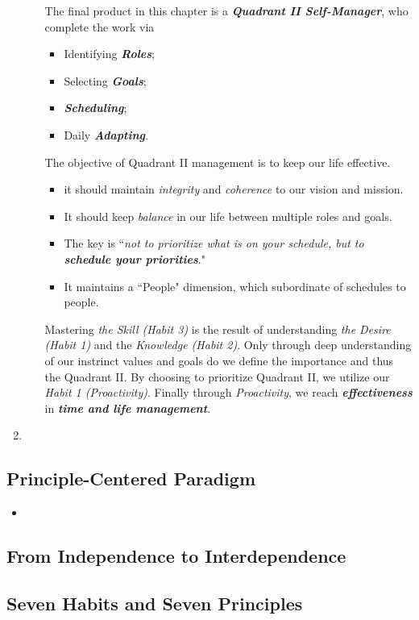 \documentclass[11pt]{article}
\begin{document}
\begin{enumerate}
\begin{enumerate}
The final product in this chapter is a \emph{\textbf{Quadrant II Self-Manager}}, who complete the work via
\begin{itemize}
\item Identifying \emph{\textbf{Roles}};
\item Selecting \emph{\textbf{Goals}};
\item \emph{\textbf{Scheduling}};
\item Daily \emph{\textbf{Adapting}}.
\end{itemize} The objective of Quadrant II management is to keep our life effective. 
\begin{itemize}
\item it should maintain \emph{integrity} and \emph{coherence} to our vision and mission. 
\item It should keep \emph{balance} in our life between multiple roles and goals. 
\item The key is ``\emph{not to prioritize what is on your schedule, but to \textbf{schedule your priorities}}."
\item It maintains a ``People" dimension, which subordinate of schedules to people.
\end{itemize}

Mastering \emph{the Skill (Habit 3)} is the result of understanding \emph{the Desire (Habit 1)} and the \emph{Knowledge (Habit 2)}. Only through deep understanding of our instrinct values and goals do we define the importance and thus the Quadrant II. By choosing to prioritize Quadrant II, we utilize our \emph{Habit 1 (Proactivity)}. Finally through \emph{Proactivity}, we reach \emph{\textbf{effectiveness}} in \emph{\textbf{time and life management}}. 
\end{enumerate}

\item 
\end{enumerate}

\subsection{Principle-Centered Paradigm}
\begin{itemize}
\item 
\end{itemize}
\subsection{From Independence to Interdependence}
\subsection{Seven Habits and Seven Principles}
\end{document}
